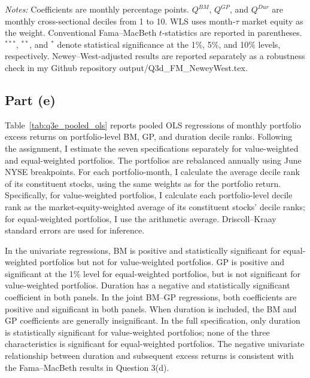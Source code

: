 \documentclass[11pt]{article}
\begin{document}
\begin{table}[!htbp]
    \vspace{0.5em}
    \begin{minipage}{0.98\textwidth}
    \footnotesize
    \textit{Notes:} Coefficients are monthly percentage points. $Q^{BM}$, $Q^{GP}$, and $Q^{Dur}$ are monthly cross-sectional deciles from 1 to 10. WLS uses month-$\tau$ market equity as the weight. Conventional Fama--MacBeth $t$-statistics are reported in parentheses. $^{***}$, $^{**}$, and $^{*}$ denote statistical significance at the 1\%, 5\%, and 10\% levels, respectively. Newey–West-adjusted results are reported separately as a robustness check in my Github repository output/Q3d\_FM\_NeweyWest.tex.
    \end{minipage}
\end{table}
\FloatBarrier

\clearpage
\subsection{Part (e)}

Table~\ref{tab:q3e_pooled_ols} reports pooled OLS regressions of monthly portfolio excess returns on portfolio-level BM, GP, and duration decile ranks. Following the assignment, I estimate the seven specifications separately for value-weighted and equal-weighted portfolios. The portfolios are rebalanced annually using June NYSE breakpoints. For each portfolio-month, I calculate the average decile rank of its constituent stocks, using the same weights as for the portfolio return. Specifically, for value-weighted portfolios, I calculate each portfolio-level decile rank as the market-equity-weighted average of its constituent stocks’ decile ranks; for equal-weighted portfolios, I use the arithmetic average. Driscoll--Kraay standard errors are used for inference.

In the univariate regressions, BM is positive and statistically significant for equal-weighted portfolios but not for value-weighted portfolios. GP is positive and significant at the 1\% level for equal-weighted portfolios, but is not significant for value-weighted portfolios. Duration has a negative and statistically significant coefficient in both panels. In the joint BM--GP regressions, both coefficients are positive and significant in both panels. When duration is included, the BM and GP coefficients are generally insignificant. In the full specification, only duration is statistically significant for value-weighted portfolios; none of the three characteristics is significant for equal-weighted portfolios. The negative univariate relationship between duration and subsequent excess returns is consistent with the Fama--MacBeth results in Question 3(d). 
\end{document}
